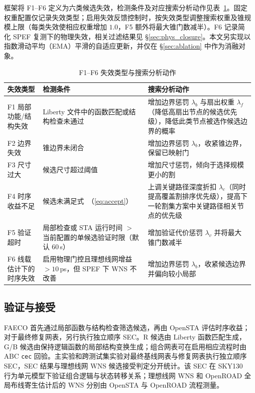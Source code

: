 \documentclass[twocolumn,10pt,fontset=windows]{ctexart}
\renewcommand{\eqref}[1]{\textup{（\ref{#1}）}}
\begin{document}
\FloatBarrier
框架将 F1--F6 定义为六类候选失效，检测条件及对应搜索分析动作见表~\ref{tab:failures}。固定权重配置仅记录失效类型；启用失效反馈控制时，按失效类型调整搜索权重及锥规模上限（每类失效使相应权重增加 $1.0$，F5 额外将最大锥门数减半）。F6 记录简化 SPEF 复测下的物理失效，相关过滤结果见 \S\ref{sec:phys_closure}。本文另实现以指数滑动平均（EMA）平滑的自适应更新，并仅在 \S\ref{sec:ablation} 中作为消融对象。

\begin{table}[!htbp]
\centering
\caption{F1--F6 失效类型与搜索分析动作}
\label{tab:failures}
\scriptsize
\setlength{\tabcolsep}{2pt}
\begin{tabular}{p{2.0cm}p{2.6cm}p{2.9cm}}
\toprule
\textbf{失效类型} & \textbf{检测条件} & \textbf{搜索分析动作} \\
\midrule
F1 局部功能/结构失效 & Liberty 文件中的函数匹配或结构检查未通过 & 增加边界惩罚 $\lambda_b$ 与扇出权重 $\lambda_f$（降低高扇出节点的候选优先级），降低此类节点被选作候选边界的概率 \\
F2 边界失效 & 锥边界未闭合 & 增加边界惩罚 $\lambda_b$，收紧锥边界，保留已映射门 \\
F3 尺寸过大 & 候选尺寸超过阈值 & 增加尺寸惩罚，倾向于选择规模更小的割 \\
F4 时序收益不足 & 候选未满足式~\eqref{eq:accept} & 上调关键路径深度折扣 $\lambda_c$（同时提高覆盖割排序优先级），提高下一轮割集方案中关键路径相关节点的优先级 \\
F5 验证超时 & 局部检查或 STA 运行时间 $>$ 当前配置的单候选验证时限（默认 $60\,$s） & 增加验证代价惩罚 $\lambda_v$ 并将最大锥门数减半 \\
F6 线载估计下的时序失效 & 启用物理门控且理想线网增益 $>10\,$ps，但 SPEF 下 WNS 不改善 & 增加边界惩罚 $\lambda_b$，收紧候选边界并偏向较小局部 \\
\bottomrule
\end{tabular}
\end{table}

\subsection{验证与接受}\label{sec:validation}
FAECO 首先通过局部函数与结构检查筛选候选，再由 OpenSTA 评估时序收益；对于最终修复网表，另行执行独立顺序 SEC。R 候选由 Liberty 函数匹配生成，G/B 候选由保持逻辑函数的局部结构变换生成；组合网表可在启用相应流程时由 ABC \texttt{cec} 回验。主实验和跨测试集实验对最终基线网表与修复网表执行独立顺序 SEC，SEC 结果与理想线网 WNS 候选接受判定分开统计。该 SEC 在 SKY130 行为单元模型下验证组合逻辑与状态转移关系；理想线网 WNS 和 OpenROAD 全局布线寄生估计后的 WNS 分别由 OpenSTA 与 OpenROAD 流程测量。
\end{document}
